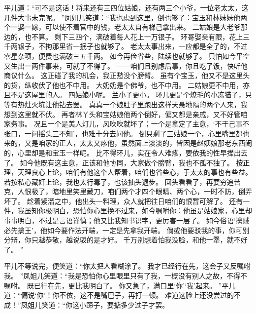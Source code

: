平儿道：“可不是这话！将来还有三四位姑娘，还有两三个小爷，一位老太太，这几件大事未完呢。
”凤姐儿笑道：“我也虑到这里，倒也够了：宝玉和林妹妹他两个一娶一嫁，可以使不着官中的钱，老太太自有梯己拿出来。
二姑娘是大老爷那边的，也不算。
剩下三四个，满破着每人花上一万银子。
环哥娶亲有限，花上三千两银子，不拘那里省一抿子也就够了。
老太太事出来，一应都是全了的，不过零星杂项，便费也满破三五千两。
如今再俭省些，陆续也就够了。
只怕如今平空又生出一两件事来，可就了不得了。
——咱们且别虑后事，你且吃了饭，快听他商议什么。
这正碰了我的机会，我正愁没个膀臂。
虽有个宝玉，他又不是这里头的货，纵收伏了他也不中用。
大奶奶是个佛爷，也不中用。
二姑娘更不中用，亦且不是这屋里的人。
四姑娘小呢。
兰小子更小。
环儿更是个燎毛的小冻猫子，只等有热灶火坑让他钻去罢。
真真一个娘肚子里跑出这样天悬地隔的两个人来，我想到这里就不伏。
再者林丫头和宝姑娘他两个倒好，偏又都是亲戚，又不好管咱家务事。
况且一个是美人灯儿，风吹吹就坏了；一个是拿定了主意，‘不干己事不张口，一问摇头三不知’，也难十分去问他。
倒只剩了三姑娘一个，心里嘴里都也来的，又是咱家的正人，太太又疼他，虽然面上淡淡的，皆因是赵姨娘那老东西闹的，心里却是和宝玉一样呢。
比不得环儿，实在令人难疼，要依我的性早撵出去了。
如今他既有这主意，正该和他协同，大家做个膀臂，我也不孤不独了。
按正理，天理良心上论，咱们有他这个人帮着，咱们也省些心，于太太的事也有些益。
若按私心藏奸上论，我也太行毒了，也该抽头退步。
回头看看了，再要穷追苦克，人恨极了，暗地里笑里藏刀，咱们两个才四个眼睛、两个心，一时不防，倒弄坏了。
趁着紧溜之中，他出头一料理，众人就把往日咱们的恨暂可解了。
还有一件，我虽知你极明白，恐怕你心里挽不过来，如今嘱咐你：他虽是姑娘家，心里却事事明白，不过是言语谨慎；他又比我知书识字，更厉害一层了。
如今俗语‘擒贼必先擒王’，他如今要作法开端，一定是先拿我开端。
倘或他要驳我的事，你可别分辩，你只越恭敬，越说驳的是才好。
千万别想着怕我没脸，和他一犟，就不好了。
”\par
平儿不等说完，便笑道：“你太把人看糊涂了。
我才已经行在先，这会子又反嘱咐我。
”凤姐儿笑道：“我是恐怕你心里眼里只有了我，一概没有别人之故，不得不嘱咐。
既已行在先，更比我明白了。
你又急了，满口里‘你’‘我’起来。
”平儿道：“偏说‘你’！你不依，这不是嘴巴子，再打一顿。
难道这脸上还没尝过的不成！”凤姐儿笑道：“你这小蹄子，要掂多少过子才罢。
